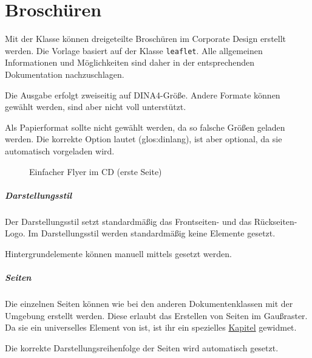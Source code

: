 \chapter{Broschüren}

Mit der Klasse  können dreigeteilte Broschüren
im Corporate Design erstellt werden.
Die Vorlage basiert auf der Klasse \texttt{leaflet}.
Alle allgemeinen Informationen und Möglichkeiten sind daher in der
entsprechenden Dokumentation\cite{cls:leaflet} nachzuschlagen.

Die Ausgabe erfolgt zweiseitig auf DINA4-Größe.
Andere Formate können gewählt werden, sind aber nicht voll unterstützt.

\begin{important}
  Als Papierformat sollte nicht  gewählt werden,
  da so falsche Größen geladen werden. Die korrekte Option lautet
   (\gls{glos:dinlang}),
  ist aber optional, da sie automatisch vorgeladen wird.
\end{important}


\begin{figure}[!ht]
  \caption{Einfacher Flyer im CD (erste Seite)}
\end{figure}

\paragraph{Darstellungsstil}\hfill

\begin{Declaration}
\end{Declaration}

Der Darstellungsstil  setzt standardmäßig das Frontseiten- und das
Rückseiten-Logo.
Im Darstellungsstil  werden standardmäßig keine Elemente gesetzt.

Hintergrundelemente können manuell mittels  gesetzt
werden.

\paragraph{Seiten}\hfill

Die einzelnen Seiten können wie bei den anderen Dokumentenklassen
mit der Umgebung  erstellt werden.
Diese erlaubt das Erstellen von Seiten im Gaußraster.
Da sie ein universelles Element von \tubslatex ist, ist ihr ein spezielles
\href{sec:gausslayout}{Kapitel} gewidmet.

Die korrekte Darstellungsreihenfolge der Seiten wird automatisch gesetzt. %
